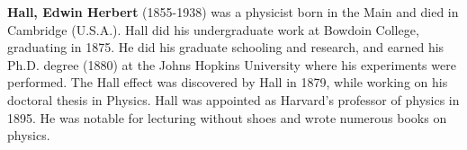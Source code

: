 {}

\textbf{Hall, Edwin Herbert} (1855-1938) was a physicist born in the Main and died in Cambridge (U.S.A.). Hall did his undergraduate work at Bowdoin College, graduating in 1875. He did his graduate schooling and research, and earned his Ph.D. degree (1880) at the Johns Hopkins University where his experiments were performed. The Hall effect was discovered by Hall in 1879, while working on his doctoral thesis in Physics. Hall was appointed as Harvard's professor of physics in 1895. He was notable for lecturing without shoes and wrote numerous books on physics.\\

